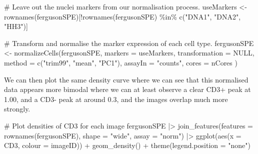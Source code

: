 \documentclass[
  letterpaper,
  DIV=11,
  numbers=noendperiod]{scrreprt}
\newenvironment{Shaded}{\begin{snugshade}}{\end{snugshade}}
\newcommand{\AttributeTok}[1]{\textcolor[rgb]{0.40,0.45,0.13}{#1}}
\newcommand{\CommentTok}[1]{\textcolor[rgb]{0.37,0.37,0.37}{#1}}
\newcommand{\ConstantTok}[1]{\textcolor[rgb]{0.56,0.35,0.01}{#1}}
\newcommand{\FunctionTok}[1]{\textcolor[rgb]{0.28,0.35,0.67}{#1}}
\newcommand{\NormalTok}[1]{\textcolor[rgb]{0.00,0.23,0.31}{#1}}
\newcommand{\OtherTok}[1]{\textcolor[rgb]{0.00,0.23,0.31}{#1}}
\newcommand{\SpecialCharTok}[1]{\textcolor[rgb]{0.37,0.37,0.37}{#1}}
\newcommand{\StringTok}[1]{\textcolor[rgb]{0.13,0.47,0.30}{#1}}
\begin{document}
\begin{Shaded}
\begin{Highlighting}[]
\CommentTok{\# Leave out the nuclei markers from our normalisation process. }
\NormalTok{useMarkers }\OtherTok{\textless{}{-}} \FunctionTok{rownames}\NormalTok{(fergusonSPE)[}\SpecialCharTok{!}\FunctionTok{rownames}\NormalTok{(fergusonSPE) }\SpecialCharTok{\%in\%} \FunctionTok{c}\NormalTok{(}\StringTok{"DNA1"}\NormalTok{, }\StringTok{"DNA2"}\NormalTok{, }\StringTok{"HH3"}\NormalTok{)]}

\CommentTok{\# Transform and normalise the marker expression of each cell type.}
\NormalTok{fergusonSPE }\OtherTok{\textless{}{-}} \FunctionTok{normalizeCells}\NormalTok{(fergusonSPE,}
                        \AttributeTok{markers =}\NormalTok{ useMarkers,}
                        \AttributeTok{transformation =} \ConstantTok{NULL}\NormalTok{,}
                        \AttributeTok{method =} \FunctionTok{c}\NormalTok{(}\StringTok{"trim99"}\NormalTok{, }\StringTok{"mean"}\NormalTok{, }\StringTok{"PC1"}\NormalTok{),}
                        \AttributeTok{assayIn =} \StringTok{"counts"}\NormalTok{,}
                        \AttributeTok{cores =}\NormalTok{ nCores}
\NormalTok{)}
\end{Highlighting}
\end{Shaded}

We can then plot the same density curve where we can see that this
normalised data appears more bimodal where we can at least observe a
clear CD3+ peak at 1.00, and a CD3- peak at around 0.3, and the images
overlap much more strongly.

\begin{Shaded}
\begin{Highlighting}[]
\CommentTok{\# Plot densities of CD3 for each image}
\NormalTok{fergusonSPE }\SpecialCharTok{|\textgreater{}} 
  \FunctionTok{join\_features}\NormalTok{(}\AttributeTok{features =} \FunctionTok{rownames}\NormalTok{(fergusonSPE), }\AttributeTok{shape =} \StringTok{"wide"}\NormalTok{, }\AttributeTok{assay =} \StringTok{"norm"}\NormalTok{) }\SpecialCharTok{|\textgreater{}} 
  \FunctionTok{ggplot}\NormalTok{(}\FunctionTok{aes}\NormalTok{(}\AttributeTok{x =}\NormalTok{ CD3, }\AttributeTok{colour =}\NormalTok{ imageID)) }\SpecialCharTok{+} 
  \FunctionTok{geom\_density}\NormalTok{() }\SpecialCharTok{+} 
  \FunctionTok{theme}\NormalTok{(}\AttributeTok{legend.position =} \StringTok{"none"}\NormalTok{)}
\end{Highlighting}
\end{Shaded}
\end{document}

